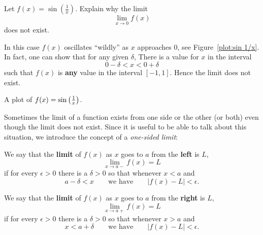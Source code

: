 \begin{example}
Let  $f(x) = \sin\left(\frac{1}{x}\right)$. Explain why the limit
\[
\lim_{x\to 0} f(x)
\]
does not exist.
\end{example}
\begin{solution}
In this case $f(x)$ oscillates ``wildly'' as $x$ approaches $0$, see
Figure~\ref{plot:sin 1/x}. In fact, one can show that for any given
  $\delta$, There is a value for $x$ in the interval
\[
0-\delta < x < 0+\delta
\]
such that $f(x)$ is \textbf{any} value in the interval $[-1,1]$. Hence
the limit does not exist.
\end{solution}
\begin{marginfigure}[-1in]
\caption{A plot of $f(x)=\protect\sin\left(\frac{1}{x}\right)$.}
\label{plot:sin 1/x}
\end{marginfigure}

Sometimes the limit of a function exists from one side or the other
(or both) even though the limit does not exist. Since it is useful to
be able to talk about this situation, we introduce the concept of a
\textit{one-sided limit}:

\begin{definition} We say that the \textbf{limit} of $f(x)$ as $x$ goes to $a$ from the \textbf{left} is $L$,
\[
\lim_{x\to a-}f(x)=L
\]
if for every $\epsilon>0$ there is a $\delta > 0$ so that whenever $x< a$ and 
\[
a-\delta < x \qquad\text{we have}\qquad |f(x)-L|<\epsilon.
\]

We say that the \textbf{limit} of $f(x)$ as $x$ goes to $a$ from the \textbf{right} is $L$,
\[
\lim_{x\to a+}f(x)=L
\] 
if for every $\epsilon>0$ there is a $\delta > 0$ so that whenever $x > a$ and 
\[
x<a+\delta \qquad\text{we have}\qquad |f(x)-L|<\epsilon.
\]
\end{definition}


